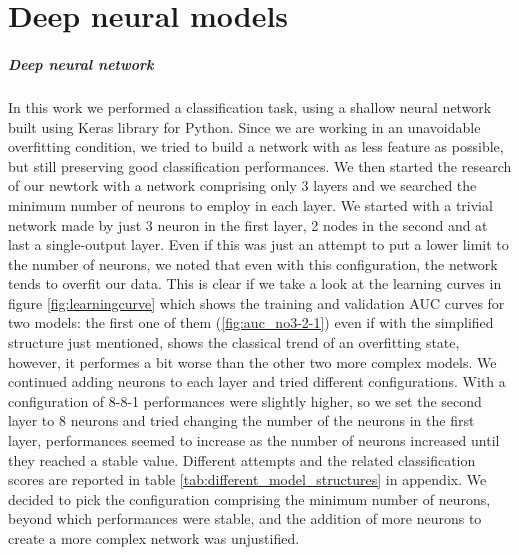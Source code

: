 \documentclass[11pt]{report}
\begin{document}
\newpage
\chapter{Deep neural models} \label{chap:deep_models}
\paragraph{Deep neural network}\hfill

In this work we performed a classification task, using a shallow neural network built using Keras library for Python.
Since we are working in an unavoidable overfitting condition, we tried to build a network with as less feature as possible, but still preserving good classification performances.
We then started the research of our newtork with a network comprising only 3 layers and we searched the minimum number of neurons to employ in each layer.
We started with a trivial network made by just 3 neuron in the first layer, 2 nodes in the second and at last a single-output layer. Even if this was just an attempt to put a lower limit to the number of neurons, we noted that even with this configuration, the network tends to overfit our data.
This is clear if we take a look at the learning curves in figure \ref{fig:learningcurve} which shows the training and validation AUC curves for two models: the first one of them (\ref{fig:auc_no3-2-1}) even if with the simplified structure just mentioned, shows the classical trend of an overfitting state, however, it performes a bit worse than the other two more complex models.
We continued adding neurons to each layer and tried different configurations. With a configuration of 8-8-1 performances were slightly higher, so we set the second layer to 8 neurons and tried changing the number of the neurons in the first layer, performances seemed to increase as the number of neurons increased until they reached a stable value. Different attempts and the related classification scores are reported in table \ref{tab:different_model_structures} in appendix.
We decided to pick the configuration comprising the minimum number of neurons, beyond which performances were stable, and the addition of more neurons to create a more complex network was unjustified.
\end{document}
